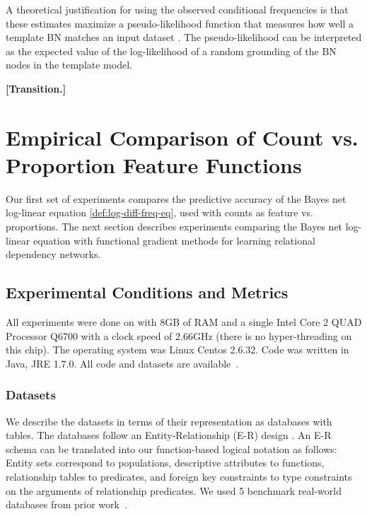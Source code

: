 \documentclass[runningheads,a4paper]{llncs}
\newcommand{\fixneeded}[1]{\textbf{[\footnotesize #1]}}
\begin{document}
A theoretical justification for using the observed conditional frequencies is that these estimates maximize a pseudo-likelihood function that measures how well a template BN matches an input dataset \cite{Schulte2011,Schulte2013}. The pseudo-likelihood can be interpreted as the expected value of the log-likelihood of a random grounding of the BN nodes in the template model.

\fixneeded{Transition.}

\section{Empirical Comparison of Count vs. Proportion Feature Functions}\label{sec:empirical-comparison}

Our first set of experiments compares the predictive accuracy of the Bayes net log-linear equation \eqref{def:log-diff-freq-eq}, used with counts as feature vs. proportions. The next section describes experiments comparing the Bayes net log-linear equation with functional gradient methods for learning relational dependency networks.

\subsection{Experimental Conditions and Metrics}\label{sec:conditions}

All experiments were done on with 8GB of RAM and a single Intel Core 2 QUAD Processor Q6700 with a clock speed of 2.66GHz (there is no hyper-threading on this chip). The operating system was Linux Centos 2.6.32. Code was written in Java, JRE 1.7.0. All code and datasets are available~\cite{bib:jbnsite}. 

\subsubsection{Datasets}

We describe the datasets in terms of their representation as databases with tables. The databases follow an Entity-Relationship (E-R) design \cite{Ullman1982}. An E-R schema can be translated into our function-based logical notation as follows: Entity sets correspond to populations, descriptive attributes to functions, relationship tables to predicates, and foreign key constraints to type constraints on the arguments of relationship predicates.
%
We used %
5 benchmark real-world databases from prior work~\cite{Schulte2012}. 
\end{document}
